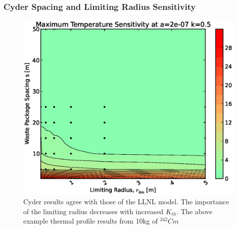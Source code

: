 \begin{frame}[ctb!]
\frametitle{Cyder Spacing and Limiting Radius Sensitivity}

\begin{figure}[htbp!]
\begin{center}
\includegraphics[height=0.7\textheight]{./thermal_demonstration/spacing/rs.eps}
\end{center}
\caption[$\alpha_{th}$ vs. $r_{lim}$ Sensitivity in Cyder]
{Cyder results agree with 
those of the LLNL model. The importance of the limiting radius decreases with 
increased $K_{th}$. The above example thermal profile results from 10kg of 
$^{242}Cm$}
\label{fig:rs}
\end{figure}
\end{frame}
